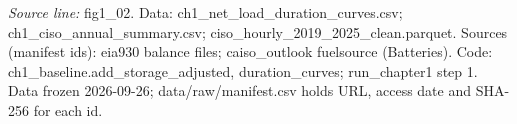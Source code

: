 {\scriptsize\textit{Source line:} fig1\_\allowbreak{}02. Data: ch1\_\allowbreak{}net\_\allowbreak{}load\_\allowbreak{}duration\_\allowbreak{}curves.csv; ch1\_\allowbreak{}ciso\_\allowbreak{}annual\_\allowbreak{}summary.csv; ciso\_\allowbreak{}hourly\_\allowbreak{}2019\_\allowbreak{}2025\_\allowbreak{}clean.parquet. Sources (manifest ids): eia930 balance files; caiso\_\allowbreak{}outlook fuelsource (Batteries). Code: ch1\_\allowbreak{}baseline.add\_\allowbreak{}storage\_\allowbreak{}adjusted, duration\_\allowbreak{}curves; run\_\allowbreak{}chapter1 step 1. Data frozen 2026-09-26; data/raw/manifest.csv holds URL, access date and SHA-256 for each id.}